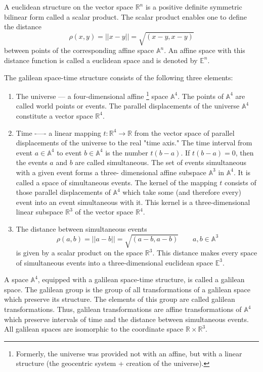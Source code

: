 \documentclass[11pt]{report}
\begin{document}
A euclidean structure on the vector space $\mathbb{R}^n$ is a positive definite symmetric
bilinear form called a scalar product. The scalar product enables one to
define the distance
\[ \rho(x,y)=||x-y||=\sqrt{(x - y,x- y)} \]
between points of the corresponding affine space $\mathbb{A}^n$. An affine space with this
distance function is called a euclidean space and is denoted by $\mathbb{E}^n$.

The galilean space-time structure consists of the following three elements:
\begin{enumerate}
    \item The universe --- a four-dimensional affine \footnote{Formerly, the universe was provided not with an affine, but with a linear structure (the geocentric system + creation of the universe).} space $\mathbb{A}^4$. 
        The points of $\mathbb{A}^4$ are called world points or events. 
        The parallel displacements of the universe $\mathbb{A}^4$
        constitute a vector space $\mathbb{R}^4$.
    \item Time -—- a linear mapping $t: \mathbb{R}^4 \rightarrow \mathbb{R}$ 
        from the vector space of parallel displacements of the 
        universe to the real "time axis." 
        The time interval from event $a \in \mathbb{A}^4$ 
        to event $b \in \mathbb{A}^4$ is the number $t(b - a)$. 
        If $t(b - a) = 0$, then the events $a$ and $b$ are called simultaneous.
The set of events simultaneous with a given event forms a three-
dimensional affine subspace $\mathbb{A}^3$ in $\mathbb{A}^4$. 
        It is called a space of simultaneous events.
The kernel of the mapping $t$ consists of those parallel displacements of
 $\mathbb{A}^4$ which take some (and therefore every) event into an event simultaneous
with it. This kernel is a three-dimensional linear subspace $\mathbb{R}^3$ of the vector
space $\mathbb{R}^4$.
\item The distance between simultaneous events
    \[\rho(a, b) = ||a - b|| =\sqrt{(a - b,a - b)}\qquad a,b \in \mathbb{A}^3 \]
is given by a scalar product on the space $\mathbb{R}^3$. This distance makes every
space of simultaneous events into a three-dimensional euclidean space $\mathbb{E}^3$.
\end{enumerate}

A space $\mathbb{A}^4$, equipped with a galilean space-time structure, is called a
galilean space. The galilean group is the group of all transformations of a galilean space
which preserve its structure. The elements of this group are called galilean
transformations. Thus, galilean transformations are affine transformations
of $\mathbb{A}^4$ which preserve intervals of time and the distance between simultaneous
events. All galilean spaces are isomorphic to the coordinate space $\mathbb{R} \times \mathbb{R}^3$.
\end{document}
